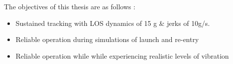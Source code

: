 The objectives of this thesis are as follows : 
\begin{itemize}
\item{Sustained tracking with \ac{LOS} dynamics of 15 g \& jerks of 10g/s.}
\item{Reliable operation during simulations of launch and re-entry}
\item{Reliable operation while while experiencing realistic levels of vibration}
\end{itemize}

